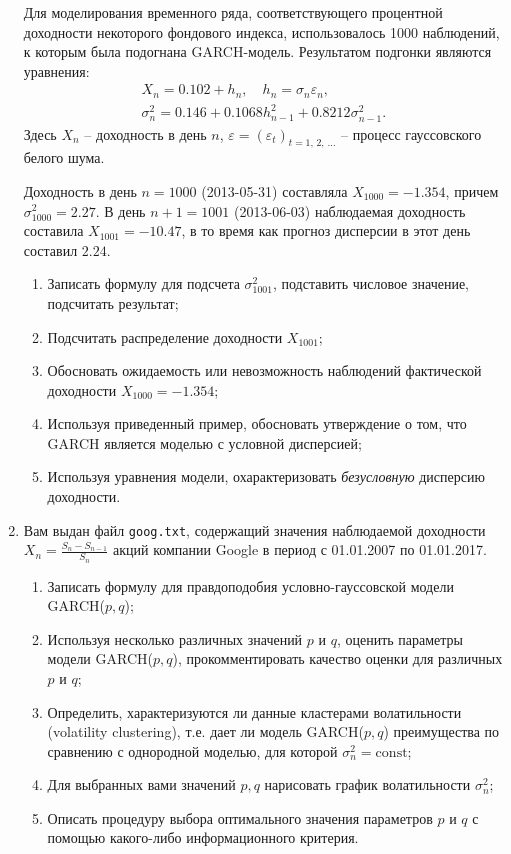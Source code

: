 \documentclass[a4paper,14pt]{extreport}
\renewcommand{\=}[1]{\stackrel{#1}{=}} %
\newcommand{\discretetime}{t = 1,\,2,\,\ldots}
\newcommand{\newprocessd}[1]{
	\ensuremath{
		#1 = \left(#1 _t\right)_{\discretetime}
	}
}
\begin{document}
\begin{enumerate}
	Для моделирования временного ряда, соответствующего процентной
	доходности некоторого фондового индекса, использовалось 1000 наблюдений,
	к которым была подогнана GARCH-модель. Результатом подгонки являются уравнения:
	\begin{align*}
	X_n = 0.102 + h_n, 
	\quad 
	h_n = \sigma_n \varepsilon_n, \\
	\sigma_n^2 = 0.146 + 0.1068 h_{n-1}^2 + 0.8212 \sigma_{n-1}^2.
	\end{align*}
	Здесь $X_n$ -- доходность в день $n$, $\newprocessd{\varepsilon}$ --
	процесс гауссовского белого шума.

	Доходность в день $n = 1000$ (2013-05-31) составляла
	$X_{1000} = -1.354$, причем $\sigma^2_{1000} =  2.27$.
	В день $n + 1 = 1001$ (2013-06-03)
	наблюдаемая доходность составила $X_{1001} = -10.47$,
	в то время как прогноз дисперсии в этот день составил $2.24$.

	\begin{enumerate}
	\item Записать формулу для подсчета $\sigma^2_{1001}$, 
	подставить числовое значение, подсчитать результат;
	\item Подсчитать распределение доходности $X_{1001}$;
	\item Обосновать ожидаемость или невозможность наблюдений
	фактической доходности $X_{1000} = -1.354$;
	\item Используя приведенный пример, обосновать утверждение
	о том, что GARCH является моделью с условной дисперсией;
	\item Используя уравнения модели, охарактеризовать
	{\em безусловную} дисперсию доходности.
	\end{enumerate}


	\item Вам выдан файл \texttt{goog.txt}, содержащий
	значения наблюдаемой доходности
	$X_n = \frac{S_n - S_{n-1}}{S_n}$ акций компании Google 
	в период с 01.01.2007 по 01.01.2017.

	\begin{enumerate}
	\item Записать формулу для правдоподобия условно-гауссовской модели
	GARCH($p, q$);
	\item Используя несколько различных значений $p$ и $q$,
	оценить параметры модели GARCH($p, q$),
	прокомментировать качество оценки для различных $p$ и $q$;
	\item Определить, характеризуются ли данные кластерами волатильности
	(volatility clustering), т.е. дает ли модель GARCH($p, q$) 
	преимущества по сравнению с однородной моделью,
	для которой $\sigma^2_n = \mathrm{const}$;
	\item Для выбранных вами значений $p,q$ нарисовать график
	волатильности $\sigma^2_n$;
	\item Описать процедуру выбора оптимального значения параметров $p$ и $q$
	с помощью какого-либо информационного критерия.
	\end{enumerate} 


\end{enumerate}
\end{document}

